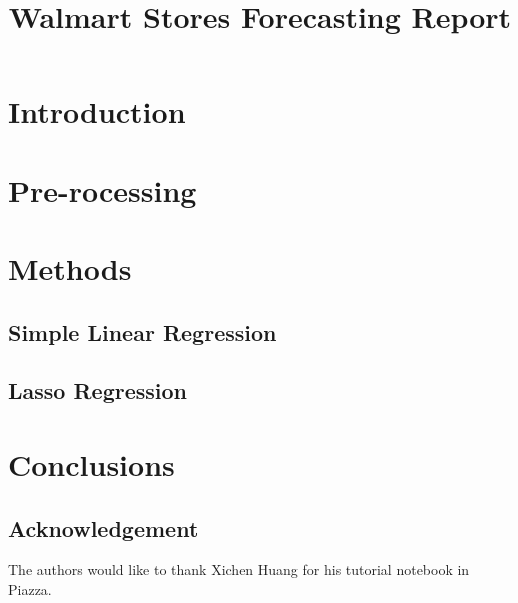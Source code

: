 \documentclass{article}
\title{Walmart Stores Forecasting Report}
\begin{document}
%
\maketitle

\section{Introduction}

\section{Pre-rocessing}

\section{Methods}

\subsection{Simple Linear Regression}

\subsection{Lasso Regression}




\section{Conclusions}
\label{sec:conclusion}


\subsection*{Acknowledgement}
\label{sec:acknowledgement}

The authors would like to thank Xichen Huang for his tutorial notebook in Piazza.

\vfill\pagebreak


%

\end{document}
